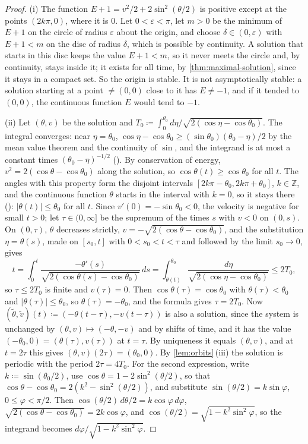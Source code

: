\begin{proof}
(i) The function $E+1=v^2/2+2\sin^2(\theta/2)$ is positive except at the points $(2k\pi,0)$, where it is $0$. Let $0<\varepsilon<\pi$, let $m>0$ be the minimum of $E+1$ on the circle of radius $\varepsilon$ about the origin, and choose $\delta\in(0,\varepsilon)$ with $E+1<m$ on the disc of radius $\delta$, which is possible by continuity. A solution that starts in this disc keeps the value $E+1<m$, so it never meets the circle and, by continuity, stays inside it; it exists for all time, by \cref{thm:maximal-solution}, since it stays in a compact set. So the origin is stable. It is not asymptotically stable: a solution starting at a point $\ne(0,0)$ close to it has $E\ne-1$, and if it tended to $(0,0)$, the continuous function $E$ would tend to $-1$.

(ii) Let $(\theta,v)$ be the solution and $T_0\coloneqq\int_0^{\theta_0}d\eta/\sqrt{2(\cos\eta-\cos\theta_0)}$. The integral converges: near $\eta=\theta_0$, $\cos\eta-\cos\theta_0\ge(\sin\theta_0)(\theta_0-\eta)/2$ by the mean value theorem and the continuity of $\sin$, and the integrand is at most a constant times $(\theta_0-\eta)^{-1/2}$ (). By conservation of energy, $v^2=2(\cos\theta-\cos\theta_0)$ along the solution, so $\cos\theta(t)\ge\cos\theta_0$ for all $t$. The angles with this property form the disjoint intervals $[2k\pi-\theta_0,2k\pi+\theta_0]$, $k\in\mathbb Z$, and the continuous function $\theta$ starts in the interval with $k=0$, so it stays there (): $|\theta(t)|\le\theta_0$ for all $t$. Since $v'(0)=-\sin\theta_0<0$, the velocity is negative for small $t>0$; let $\tau\in(0,\infty]$ be the supremum of the times $s$ with $v<0$ on $(0,s)$. On $(0,\tau)$, $\theta$ decreases strictly, $v=-\sqrt{2(\cos\theta-\cos\theta_0)}$, and the substitution $\eta=\theta(s)$, made on $[s_0,t]$ with $0<s_0<t<\tau$ and followed by the limit $s_0\to0$, gives
\[
t=\int_0^t\frac{-\theta'(s)}{\sqrt{2(\cos\theta(s)-\cos\theta_0)}}\,ds=\int_{\theta(t)}^{\theta_0}\frac{d\eta}{\sqrt{2(\cos\eta-\cos\theta_0)}}\le2T_0 ,
\]
so $\tau\le2T_0$ is finite and $v(\tau)=0$. Then $\cos\theta(\tau)=\cos\theta_0$ with $\theta(\tau)<\theta_0$ and $|\theta(\tau)|\le\theta_0$, so $\theta(\tau)=-\theta_0$, and the formula gives $\tau=2T_0$. Now $(\tilde\theta,\tilde v)(t)\coloneqq(-\theta(t-\tau),-v(t-\tau))$ is also a solution, since the system is unchanged by $(\theta,v)\mapsto(-\theta,-v)$ and by shifts of time, and it has the value $(-\theta_0,0)=(\theta(\tau),v(\tau))$ at $t=\tau$. By uniqueness it equals $(\theta,v)$, and at $t=2\tau$ this gives $(\theta,v)(2\tau)=(\theta_0,0)$. By \cref{lem:orbits}\,(iii) the solution is periodic with the period $2\tau=4T_0$. For the second expression, write $k\coloneqq\sin(\theta_0/2)$, use $\cos\theta=1-2\sin^2(\theta/2)$, so that $\cos\theta-\cos\theta_0=2(k^2-\sin^2(\theta/2))$, and substitute $\sin(\theta/2)=k\sin\varphi$, $0\le\varphi<\pi/2$. Then $\cos(\theta/2)\,d\theta/2=k\cos\varphi\,d\varphi$, $\sqrt{2(\cos\theta-\cos\theta_0)}=2k\cos\varphi$, and $\cos(\theta/2)=\sqrt{1-k^2\sin^2\varphi}$, so the integrand becomes $d\varphi/\sqrt{1-k^2\sin^2\varphi}$.


\end{proof}
